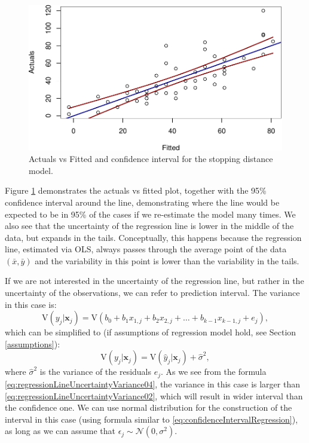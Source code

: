 \documentclass[
]{book}
\theoremstyle{definition}
\theoremstyle{definition}
\theoremstyle{definition}
\theoremstyle{definition}
\theoremstyle{remark}
\begin{document}
\begin{figure}
\centering
\includegraphics{Svetunkov---Statistics-for-Business-Analytics_files/figure-latex/speedDistanceConfidenceIntervalAvsF-1.pdf}
\caption{\label{fig:speedDistanceConfidenceIntervalAvsF}Actuals vs Fitted and confidence interval for the stopping distance model.}
\end{figure}

Figure \ref{fig:speedDistanceConfidenceIntervalAvsF} demonstrates the actuals vs fitted plot, together with the 95\% confidence interval around the line, demonstrating where the line would be expected to be in 95\% of the cases if we re-estimate the model many times. We also see that the uncertainty of the regression line is lower in the middle of the data, but expands in the tails. Conceptually, this happens because the regression line, estimated via OLS, always passes through the average point of the data \((\bar{x},\bar{y})\) and the variability in this point is lower than the variability in the tails.

If we are not interested in the uncertainty of the regression line, but rather in the uncertainty of the observations, we can refer to prediction interval. The variance in this case is:
\begin{equation}
    \mathrm{V}(y_j| \mathbf{x}_j) = \mathrm{V}(b_0 + b_1 x_{1,j} + b_2 x_{2,j} + \dots + b_{k-1} x_{k-1,j} + e_j) ,
    \label{eq:regressionLineUncertaintyVariance03}
\end{equation}
which can be simplified to (if assumptions of regression model hold, see Section \ref{assumptions}):
\begin{equation}
    \mathrm{V}(y_j| \mathbf{x}_j) = \mathrm{V}(\hat{y}_j| \mathbf{x}_j) + \hat{\sigma}^2,
    \label{eq:regressionLineUncertaintyVariance04}
\end{equation}
where \(\hat{\sigma}^2\) is the variance of the residuals \(e_j\). As we see from the formula \eqref{eq:regressionLineUncertaintyVariance04}, the variance in this case is larger than \eqref{eq:regressionLineUncertaintyVariance02}, which will result in wider interval than the confidence one. We can use normal distribution for the construction of the interval in this case (using formula similar to \eqref{eq:confidenceIntervalRegression}), as long as we can assume that \(\epsilon_j \sim \mathcal{N}(0,\sigma^2)\).
\end{document}
